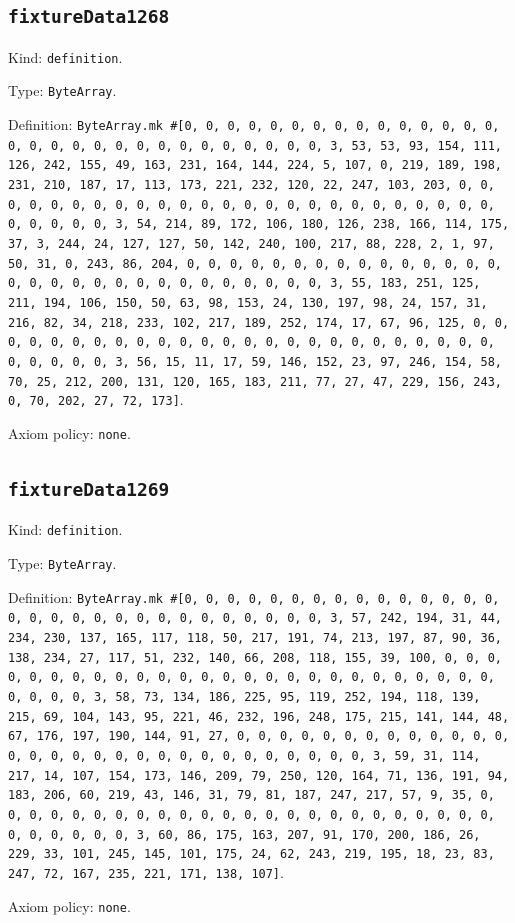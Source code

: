 \documentclass[11pt]{article}
\begin{document}
\subsection*{\texttt{fixtureData1268}}
\noindent Kind: \texttt{definition}.\par
\noindent Type: \texttt{ByteArray}.\par
\noindent Definition: \texttt{ByteArray.mk \#[0, 0, 0, 0, 0, 0, 0, 0, 0, 0, 0, 0, 0, 0, 0, 0, 0, 0, 0, 0, 0, 0, 0, 0, 0, 0, 0, 0, 0, 0, 3, 53, 53, 93, 154, 111, 126, 242, 155, 49, 163, 231, 164, 144, 224, 5, 107, 0, 219, 189, 198, 231, 210, 187, 17, 113, 173, 221, 232, 120, 22, 247, 103, 203, 0, 0, 0, 0, 0, 0, 0, 0, 0, 0, 0, 0, 0, 0, 0, 0, 0, 0, 0, 0, 0, 0, 0, 0, 0, 0, 0, 0, 0, 0, 3, 54, 214, 89, 172, 106, 180, 126, 238, 166, 114, 175, 37, 3, 244, 24, 127, 127, 50, 142, 240, 100, 217, 88, 228, 2, 1, 97, 50, 31, 0, 243, 86, 204, 0, 0, 0, 0, 0, 0, 0, 0, 0, 0, 0, 0, 0, 0, 0, 0, 0, 0, 0, 0, 0, 0, 0, 0, 0, 0, 0, 0, 0, 0, 3, 55, 183, 251, 125, 211, 194, 106, 150, 50, 63, 98, 153, 24, 130, 197, 98, 24, 157, 31, 216, 82, 34, 218, 233, 102, 217, 189, 252, 174, 17, 67, 96, 125, 0, 0, 0, 0, 0, 0, 0, 0, 0, 0, 0, 0, 0, 0, 0, 0, 0, 0, 0, 0, 0, 0, 0, 0, 0, 0, 0, 0, 0, 0, 3, 56, 15, 11, 17, 59, 146, 152, 23, 97, 246, 154, 58, 70, 25, 212, 200, 131, 120, 165, 183, 211, 77, 27, 47, 229, 156, 243, 0, 70, 202, 27, 72, 173]}.\par
\noindent Axiom policy: \texttt{none}.\par
\subsection*{\texttt{fixtureData1269}}
\noindent Kind: \texttt{definition}.\par
\noindent Type: \texttt{ByteArray}.\par
\noindent Definition: \texttt{ByteArray.mk \#[0, 0, 0, 0, 0, 0, 0, 0, 0, 0, 0, 0, 0, 0, 0, 0, 0, 0, 0, 0, 0, 0, 0, 0, 0, 0, 0, 0, 0, 0, 3, 57, 242, 194, 31, 44, 234, 230, 137, 165, 117, 118, 50, 217, 191, 74, 213, 197, 87, 90, 36, 138, 234, 27, 117, 51, 232, 140, 66, 208, 118, 155, 39, 100, 0, 0, 0, 0, 0, 0, 0, 0, 0, 0, 0, 0, 0, 0, 0, 0, 0, 0, 0, 0, 0, 0, 0, 0, 0, 0, 0, 0, 0, 0, 3, 58, 73, 134, 186, 225, 95, 119, 252, 194, 118, 139, 215, 69, 104, 143, 95, 221, 46, 232, 196, 248, 175, 215, 141, 144, 48, 67, 176, 197, 190, 144, 91, 27, 0, 0, 0, 0, 0, 0, 0, 0, 0, 0, 0, 0, 0, 0, 0, 0, 0, 0, 0, 0, 0, 0, 0, 0, 0, 0, 0, 0, 0, 0, 3, 59, 31, 114, 217, 14, 107, 154, 173, 146, 209, 79, 250, 120, 164, 71, 136, 191, 94, 183, 206, 60, 219, 43, 146, 31, 79, 81, 187, 247, 217, 57, 9, 35, 0, 0, 0, 0, 0, 0, 0, 0, 0, 0, 0, 0, 0, 0, 0, 0, 0, 0, 0, 0, 0, 0, 0, 0, 0, 0, 0, 0, 0, 0, 3, 60, 86, 175, 163, 207, 91, 170, 200, 186, 26, 229, 33, 101, 245, 145, 101, 175, 24, 62, 243, 219, 195, 18, 23, 83, 247, 72, 167, 235, 221, 171, 138, 107]}.\par
\noindent Axiom policy: \texttt{none}.\par
\end{document}
